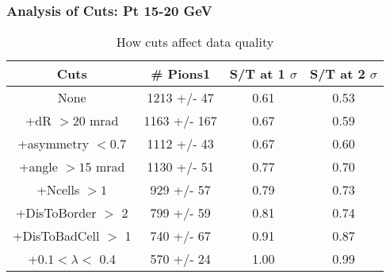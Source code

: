 \frame
{
\frametitle{Analysis of Cuts: Pt 15-20 GeV}
\begin{table}
\caption{How cuts affect data quality}
\centering
\begin{tabular}{c c c c}
\hline\hline
Cuts & \# Pions1 & S/T at 1 $\sigma$ & S/T at 2 $\sigma$ \\ [0.5ex]
\hline
None & 1213 +/-   47 & 0.61 & 0.53 \\ %
+dR $> 20$ mrad & 1163 +/-  167 & 0.67 & 0.59 \\ %
+asymmetry $< 0.7$ & 1112 +/-   43 & 0.67 & 0.60 \\ %
+angle $> 15$ mrad & 1130 +/-   51 & 0.77 & 0.70 \\ %
+Ncells $> 1$&  929 +/-   57 & 0.79 & 0.73 \\ %
+DisToBorder $>$ 2 &  799 +/-   59 & 0.81 & 0.74 \\ %
+DisToBadCell $>$ 1&  740 +/-   67 & 0.91 & 0.87 \\ %
+$0.1 < \lambda <$ 0.4 &  570 +/-   24 & 1.00 & 0.99 \\ %
[1ex]
\hline
\end{tabular}
\label{table:nonlin}
\end{table}
}
